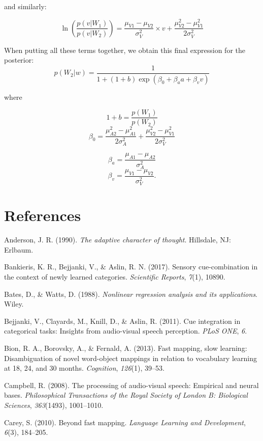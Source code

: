 \documentclass[english,floatsintext,man]{apa6}
\theoremstyle{definition}
\theoremstyle{definition}
\theoremstyle{definition}
\theoremstyle{remark}
\begin{document}
and similarly:

\[\ln(\frac{p(v|W_1)}{p(v|W_2)})=\frac{\mu_{V1}-\mu_{V2}}{\sigma^2_{V}}\times v+ \frac{\mu^2_{V2}-\mu^2_{V1}}{2\sigma^2_{V}}\]

When putting all these terms together, we obtain this final expression
for the posterior:
\[p(W_2 | w)=\frac{1}{1+(1+b)\exp(\beta_0+\beta_aa+\beta_vv)}\]

where

\[1+b=\frac{p(W_1)}{p(W_2)}\]
\[\beta_0=\frac{\mu^2_{A2}-\mu^2_{A1}}{2\sigma^2_{A}}+\frac{\mu^2_{V2}-\mu^2_{V1}}{2\sigma^2_{V}}\]

\[\beta_a=\frac{\mu_{A1}-\mu_{A2}}{\sigma^2_{A}}\]
\[\beta_v=\frac{\mu_{V1}-\mu_{V2}}{\sigma^2_{V}}.\]

\section{References}\label{references}

\setlength{\parindent}{-0.5in} \setlength{\leftskip}{0.5in}

\hypertarget{refs}{}
\hypertarget{ref-anderson90}{}
Anderson, J. R. (1990). \emph{The adaptive character of thought}.
Hillsdale, NJ: Erlbaum.

\hypertarget{ref-Bankieris17}{}
Bankieris, K. R., Bejjanki, V., \& Aslin, R. N. (2017). Sensory
cue-combination in the context of newly learned categories.
\emph{Scientific Reports}, \emph{7}(1), 10890.

\hypertarget{ref-bates88}{}
Bates, D., \& Watts, D. (1988). \emph{Nonlinear regression analysis and
its applications}. Wiley.

\hypertarget{ref-bejjanki2011}{}
Bejjanki, V., Clayards, M., Knill, D., \& Aslin, R. (2011). Cue
integration in categorical tasks: Insights from audio-visual speech
perception. \emph{PLoS ONE}, \emph{6}.

\hypertarget{ref-bion2013}{}
Bion, R. A., Borovsky, A., \& Fernald, A. (2013). Fast mapping, slow
learning: Disambiguation of novel word-object mappings in relation to
vocabulary learning at 18, 24, and 30 months. \emph{Cognition},
\emph{126}(1), 39--53.

\hypertarget{ref-Campbell2008}{}
Campbell, R. (2008). The processing of audio-visual speech: Empirical
and neural bases. \emph{Philosophical Transactions of the Royal Society
of London B: Biological Sciences}, \emph{363}(1493), 1001--1010.

\hypertarget{ref-carey2010}{}
Carey, S. (2010). Beyond fast mapping. \emph{Language Learning and
Development}, \emph{6}(3), 184--205.
\end{document}
